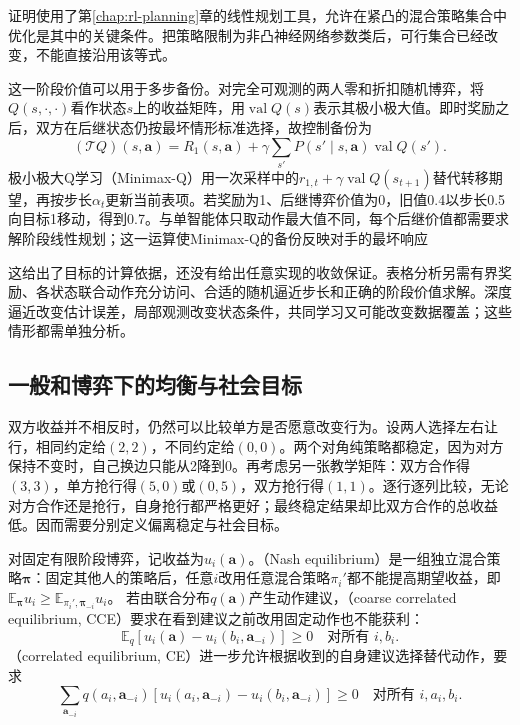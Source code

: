证明使用了第\ref{chap:rl-planning}章的线性规划工具，允许在紧凸的混合策略集合中优化是其中的关键条件。把策略限制为非凸神经网络参数类后，可行集合已经改变，不能直接沿用该等式。

这一阶段价值可以用于多步备份。对完全可观测的两人零和折扣随机博弈，将$Q(s,\cdot,\cdot)$看作状态$s$上的收益矩阵，用$\operatorname{val}Q(s)$表示其极小极大值。即时奖励之后，双方在后继状态仍按最坏情形标准选择，故控制备份为
\begin{equation}
 (\mathcal T Q)(s,\bm a)
 =R_1(s,\bm a)+\gamma\sum_{s'}P(s'\mid s,\bm a)
           \operatorname{val}Q(s').
 \label{eq:rl-multi-agent-minimax-backup}
\end{equation}
极小极大Q学习（Minimax-Q）用一次采样中的$r_{1,t}+\gamma\operatorname{val}Q(s_{t+1})$替代转移期望，再按步长$\alpha_t$更新当前表项。若奖励为1、后继博弈价值为0，旧值0.4以步长0.5向目标1移动，得到0.7。与单智能体只取动作最大值不同，每个后继价值都需要求解阶段线性规划；这一运算使Minimax-Q的备份反映对手的最坏响应

这给出了目标的计算依据，还没有给出任意实现的收敛保证。表格分析另需有界奖励、各状态联合动作充分访问、合适的随机逼近步长和正确的阶段价值求解。深度逼近改变估计误差，局部观测改变状态条件，共同学习又可能改变数据覆盖；这些情形都需单独分析。

\subsection{一般和博弈下的均衡与社会目标}
\label{sec:rl-multi-agent-equilibria}

双方收益并不相反时，仍然可以比较单方是否愿意改变行为。设两人选择左右让行，相同约定给$(2,2)$，不同约定给$(0,0)$。两个对角纯策略都稳定，因为对方保持不变时，自己换边只能从2降到0。再考虑另一张教学矩阵：双方合作得$(3,3)$，单方抢行得$(5,0)$或$(0,5)$，双方抢行得$(1,1)$。逐行逐列比较，无论对方合作还是抢行，自身抢行都严格更好；最终稳定结果却比双方合作的总收益低。因而需要分别定义偏离稳定与社会目标。

\begin{definition}[有限阶段博弈的偏离标准]
\label{def:rl-multi-agent-equilibria}
对固定有限阶段博弈，记收益为$u_i(\bm a)$。（Nash equilibrium）是一组独立混合策略$\bm\pi$：固定其他人的策略后，任意$i$改用任意混合策略$\pi_i'$都不能提高期望收益，即
$\mathbb E_{\bm\pi}u_i\geq\mathbb E_{\pi_i',\bm\pi_{-i}}u_i$。
若由联合分布$q(\bm a)$产生动作建议，（coarse correlated equilibrium, CCE）要求在看到建议之前改用固定动作也不能获利：
\[
 \mathbb E_q[u_i(\bm a)-u_i(b_i,\bm a_{-i})]\geq0
 \quad\text{对所有 }i,b_i.
\]
（correlated equilibrium, CE）进一步允许根据收到的自身建议选择替代动作，要求
\[
 \sum_{\bm a_{-i}}q(a_i,\bm a_{-i})
 [u_i(a_i,\bm a_{-i})-u_i(b_i,\bm a_{-i})]\geq0
 \quad\text{对所有 }i,a_i,b_i.
\]
\end{definition}

